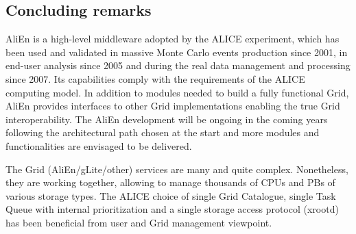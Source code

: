 \subsection{Concluding remarks}
%
AliEn is a high-level middleware adopted by
the ALICE experiment, which has been used and validated in massive
Monte Carlo events production since 2001, in end-user analysis since
2005 and during the real data management and processing since 2007.
Its capabilities comply with the requirements of the ALICE computing
model. In addition to modules needed to build a fully functional
Grid, AliEn provides interfaces to other Grid implementations
enabling the true Grid interoperability. The AliEn development will
be ongoing in the coming years following the architectural path
chosen at the start and more modules and functionalities are
envisaged to be delivered.

The Grid (AliEn/gLite/other) services are many and quite complex.
Nonetheless, they are working together, allowing to manage thousands
of CPUs and PBs of various storage types. The ALICE choice of single
Grid Catalogue, single Task Queue with internal prioritization and a
single storage access protocol (xrootd) has been beneficial from
user and Grid management viewpoint.

